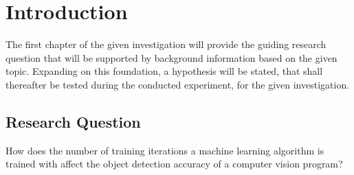 

\section{Introduction}
The first chapter of the given investigation will provide the guiding research question that will be supported by background information based on the given topic. Expanding on this foundation, a hypothesis will be stated, that shall thereafter be tested during the conducted experiment, for the given investigation. \\

\subsection{Research Question}
How does the number of training iterations a machine learning algorithm is trained with affect the object detection accuracy of a computer vision program? \\

